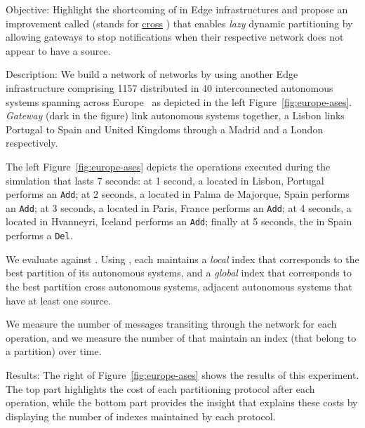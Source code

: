 \begin{asparadesc}
  \item[Objective:] Highlight the shortcoming of \NAME in Edge
    infrastructures and propose an improvement called \NAMEC (stands
    for \underline{cross} \underline{\NAME}) that enables \emph{lazy}
    dynamic partitioning by allowing gateways to stop notifications
    when their respective network does not appear to have a source.
    
  \item[Description:] We build a network of networks by using another
    Edge infrastructure comprising 1157 \processes distributed in 40
    interconnected autonomous systems spanning across
    Europe~\cite{knight2011internet} as depicted in the left
    Figure~\ref{fig:europe-ases}. \emph{Gateway} \processes (dark in
    the figure) link autonomous systems together, \eg a Lisbon \node
    links Portugal to Spain and United Kingdoms through a Madrid \node
    and a London \node respectively.

    \noindent The left Figure~\ref{fig:europe-ases} depicts the
    operations executed during the simulation that lasts 7 seconds: at
    1 second, a \node located in Lisbon, Portugal performs an
    \texttt{Add}; at 2 seconds, a \node located in Palma de Majorque,
    Spain performs an \texttt{Add}; at 3 seconds, a \node located in
    Paris, France performs an \texttt{Add}; at 4 seconds, a \node
    located in Hvanneyri, Iceland performs an \texttt{Add};
    finally at 5 seconds, the \node in Spain performs a \texttt{Del}.
    
    \noindent We evaluate \NAME against \NAMEC. Using \NAMEC, each
    \process maintains a \emph{local} index that corresponds to the
    best partition of its autonomous systems, and a \emph{global}
    index that corresponds to the best partition cross autonomous
    systems, \ie adjacent autonomous systems that have at least one
    source.
    
    \noindent We measure the number of messages transiting through the
    network for each operation, and we measure the number of
    \processes that maintain an index (\ie that belong to a partition)
    over time.
    
  \item[Results:] The right of Figure~\ref{fig:europe-ases} shows the
    results of this experiment. The top part highlights the cost of
    each partitioning protocol after each operation, while the bottom
    part provides the insight that explains these costs by displaying
    the number of indexes maintained by each protocol.


\end{asparadesc}
